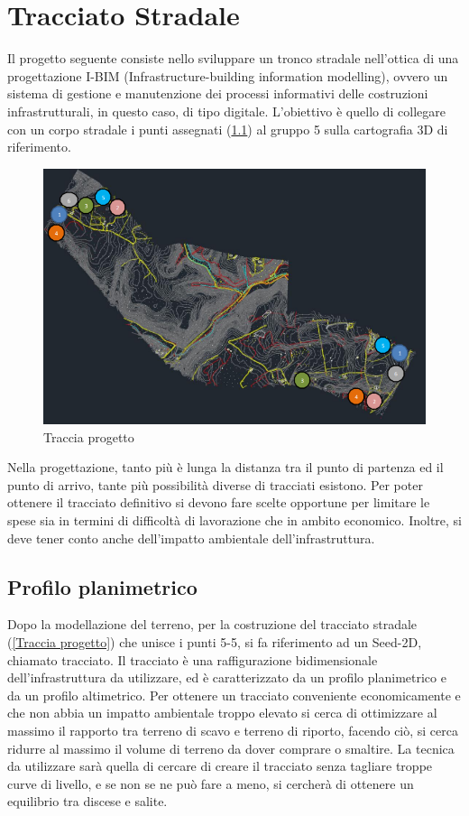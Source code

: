 \chapter{Tracciato Stradale}

Il progetto seguente consiste nello sviluppare un tronco stradale nell’ottica di una progettazione I-BIM
(Infrastructure-building information modelling), ovvero un sistema di gestione e manutenzione dei processi
informativi delle costruzioni infrastrutturali, in questo caso, di tipo digitale. L’obiettivo è quello di
collegare con un corpo stradale i punti assegnati (\ref{tracciaprogetto}) al gruppo 5 sulla cartografia 3D di riferimento.

\begin{figure}[H]
    \includegraphics[width=\textwidth]{Figures/Traccia progetto.png}
      \caption{Traccia progetto}
      \label{tracciaprogetto}
\end{figure}

Nella progettazione, tanto più è lunga la distanza tra il punto di partenza ed il punto di arrivo, tante
più possibilità diverse di tracciati esistono. Per poter ottenere il tracciato definitivo si devono fare scelte
opportune per limitare le spese sia in termini di difficoltà di lavorazione che in ambito economico. Inoltre,
si deve tener conto anche dell’impatto ambientale dell’infrastruttura.

\section{Profilo planimetrico}

Dopo la modellazione del terreno, per la costruzione del tracciato stradale (\ref{Traccia progetto}) che unisce i punti 5-5, si fa riferimento ad un Seed-2D, chiamato tracciato. 
Il tracciato è una raffigurazione bidimensionale dell'infrastruttura da utilizzare, ed è caratterizzato da un profilo planimetrico e da un profilo altimetrico. Per ottenere un tracciato conveniente economicamente e che non abbia un impatto ambientale troppo elevato si cerca di ottimizzare al massimo il rapporto tra terreno di scavo e terreno di riporto, facendo ciò, si cerca ridurre al massimo il volume di terreno da dover comprare o smaltire. La tecnica da utilizzare sarà quella di cercare di creare il tracciato senza tagliare troppe curve di livello, e se non se ne può fare a meno, si cercherà di ottenere un equilibrio tra discese e salite.

